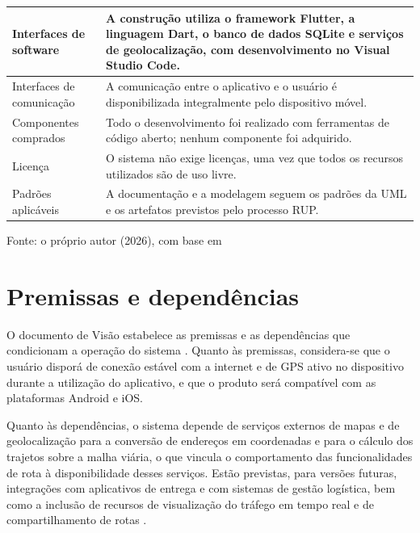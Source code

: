 \begin{table}[!ht]
\begin{tabular}{p{3.5cm} p{11cm}}
        \hline
        Interfaces de software & A construção utiliza o framework Flutter, a linguagem Dart, o banco de dados SQLite e serviços de geolocalização, com desenvolvimento no Visual Studio Code. \\
        \hline
        Interfaces de comunicação & A comunicação entre o aplicativo e o usuário é disponibilizada integralmente pelo dispositivo móvel. \\
        \hline
        Componentes comprados & Todo o desenvolvimento foi realizado com ferramentas de código aberto; nenhum componente foi adquirido. \\
        \hline
        Licença & O sistema não exige licenças, uma vez que todos os recursos utilizados são de uso livre. \\
        \hline
        Padrões aplicáveis & A documentação e a modelagem seguem os padrões da UML e os artefatos previstos pelo processo RUP. \\
        \hline
    \end{tabular}
    \vspace{2pt}
    \footnotesize Fonte: o próprio autor (2026), com base em 
\end{table}

\section{Premissas e dependências}

O documento de Visão estabelece as premissas e as dependências que condicionam a operação do sistema \cite{sriVisao2025}. Quanto às premissas, considera-se que o usuário disporá de conexão estável com a internet e de GPS ativo no dispositivo durante a utilização do aplicativo, e que o produto será compatível com as plataformas Android e iOS.

Quanto às dependências, o sistema depende de serviços externos de mapas e de geolocalização para a conversão de endereços em coordenadas e para o cálculo dos trajetos sobre a malha viária, o que vincula o comportamento das funcionalidades de rota à disponibilidade desses serviços. Estão previstas, para versões futuras, integrações com aplicativos de entrega e com sistemas de gestão logística, bem como a inclusão de recursos de visualização do tráfego em tempo real e de compartilhamento de rotas \cite{sriVisao2025}.
